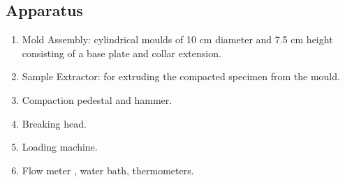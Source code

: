 \subsection{Apparatus}
\vspace{.5cm}
\begin{enumerate}
\item Mold Assembly: cylindrical moulds of 10 cm diameter and 7.5 cm height consisting of a base plate and collar extension.
\item Sample Extractor: for extruding the compacted specimen from the mould.
\item Compaction pedestal and hammer.
\item Breaking head.
\item Loading machine.
\item Flow meter , water bath, thermometers.
\end{enumerate}

